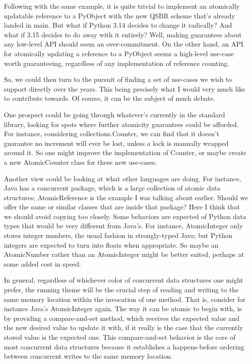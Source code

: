 Following with the same example, it is quite trivial to implement an atomically updatable reference to a PyObject with the new QSBR scheme that's already landed in main.
But what if Python 3.14 decides to change it radically?
And what if 3.15 decides to do away with it entirely?
Well, making guarantees about any low-level API should seem an over-commitment.
On the other hand, an API for atomically updating a reference to a PyObject seems a high-level use-case worth guaranteeing, regardless of any implementation of reference counting.

So, we could then turn to the pursuit of finding a set of use-cases we wish to support directly over the years.
This being precisely what I would very much like to contribute towards.
Of course, it can be the subject of much debate.

One prospect could be going through whatever's currently in the standard library, looking for spots where further atomicity guarantees could be afforded.
 For instance, considering collections.Counter, we can find that it doesn't guarantee no increment will ever be lost, unless a lock is manually wrapped around it.
So one might improve the implementation of Counter, or maybe create a new AtomicCounter class for these new use-cases.

Another view could be looking at what other languages are doing.
For instance,  Java has a concurrent package, which is a large collection of atomic data structures; AtomicReference is the example I was talking about earlier.
Should we offer the same or similar classes that are inside that package?
Here I think that we should avoid copying too closely.
Some behaviors are expected of Python data types that would be very different from Java's.
For instance, AtomicInteger only stores integer numbers, the usual fashion in strongly-typed Java; but Python integers are expected to turn into floats when appropriate.
So maybe an AtomicNumber rather than an AtomicInteger might be better suited, perhaps at some added cost in speed.

In general, regardless of whichever color of concurrent data structures one might prefer, the running theme will be the crucial step of reading and writing to the same memory location within the invocation of one method.
That is, consider for instance Java's AtomicInteger again.
The way it can be atomic to begin with, is by providing a compare-and-set method, which receives the expected value and the new desired value to update it with, if it really is the case that the currently stored value is the expected one.
This compare-and-set behavior is the core of most concurrent data structures because it establishes a happens-before ordering between concurrent writes to the same memory location.

